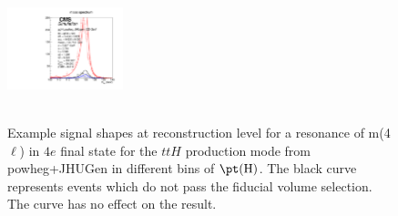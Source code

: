 \begin{figure}[htb]
\begin{center}
{      \includegraphics[width=0.3\textwidth,angle=0]{Figures/Appendix//ggH_powheg_JHUgen_125_4e_pT4l_genbin4_recobin4_effs_genWeight*pileupWeight*dataMCWeight.pdf}
      \label{fig:sigfits-pT4l-ggH-powheg15-JHUgen-125-maintext:e}
    }
     \\
    \\
    \caption{ Example signal shapes at reconstruction level for a resonance of m(4$\ell$) in $4e$ final state for the $ttH$ production mode from {\sc powheg+JHUGen} in different bins of $\pt(\mathrm{H})$. The black curve represents events which do not pass the fiducial volume selection. The curve has no effect on the result.
    }
  \label{fig:sigfits-pT4l-ggH-powheg15-JHUgen-125-maintext}
 \end{center}
\end{figure} \clearpage



